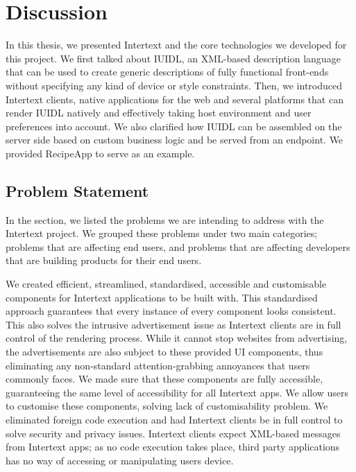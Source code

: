 
\chapter{Discussion} \label{discussion}

In this thesis, we presented Intertext and the core technologies we developed for this project. We first talked about IUIDL, an XML-based description language that can be used to create generic descriptions of fully functional front-ends without specifying any kind of device or style constraints. Then, we introduced Intertext clients, native applications for the web and several platforms that can render IUIDL natively and effectively taking host environment and user preferences into account. We also clarified how IUIDL can be assembled on the server side based on custom business logic and be served from an endpoint. We provided RecipeApp to serve as an example.

\section{Problem Statement}

In the  section, we listed the problems we are intending to address with the Intertext project. We grouped these problems under two main categories; problems that are affecting end users, and problems that are affecting developers that are building products for their end users.

We created efficient, streamlined, standardised, accessible and customisable components for Intertext applications to be built with. This standardised approach guarantees that every instance of every component looks consistent. This also solves the intrusive advertisement issue as Intertext clients are in full control of the rendering process. While it cannot stop websites from advertising, the advertisements are also subject to these provided UI components, thus eliminating any non-standard attention-grabbing annoyances that users commonly faces. We made sure that these components are fully accessible, guaranteeing the same level of accessibility for all Intertext apps. We allow users to customise these components, solving lack of customisability problem. We eliminated foreign code execution and had Intertext clients be in full control to solve security and privacy issues. Intertext clients expect XML-based messages from Intertext apps; as no code execution takes place, third party applications has no way of accessing or manipulating users device.

